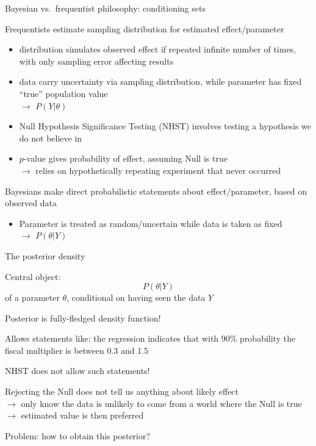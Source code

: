 \begin{frame}{Bayesian vs.\ frequentist philosophy: conditioning sets}
\begin{witemize}
    \item Frequentists estimate sampling distribution for estimated effect/parameter
    \begin{itemize}
      \item distribution simulates observed effect if repeated infinite number of times, with only sampling error affecting results
      \item data carry uncertainty via sampling distribution, while parameter has fixed ``true'' population value\\
      $\rightarrow$  $P(Y|\theta)$
      \item Null Hypothesis Significance Testing (NHST) involves testing a hypothesis we do not believe in
      \item $p$-value gives probability of effect, assuming Null is true\\
      $\rightarrow$ relies on hypothetically repeating experiment that never occurred
    \end{itemize}
    \item Bayesians make direct probabilistic statements about effect/parameter, based on observed data
    \begin{itemize}
      \item Parameter is treated as random/uncertain while data is taken as fixed\\
      $\rightarrow$  $P(\theta|Y)$
    \end{itemize}
\end{witemize}
\end{frame}

\renewcommand{\Source}{\textcite{Koop2003}, Ch. 1}
\begin{frame}{The posterior density}
\begin{witemize}
    \item Central object: 
    \begin{equation}
      P(\theta|Y)
    \end{equation}
    of a parameter $\theta$, conditional on having seen the data $Y$
    \item Posterior is fully-fledged density function!
    \item Allows statements like: the regression indicates that with 90\% probability the fiscal multiplier is between 0.3 and 1.5
    \item NHST does not allow such statements!
    \item Rejecting the Null does not tell us anything about likely effect\\
    $\rightarrow$ only know the data is unlikely to come from a world where the Null is true\\
    $\rightarrow$ estimated value is then preferred
    \item Problem: how to obtain this posterior?
\end{witemize}
\end{frame}

